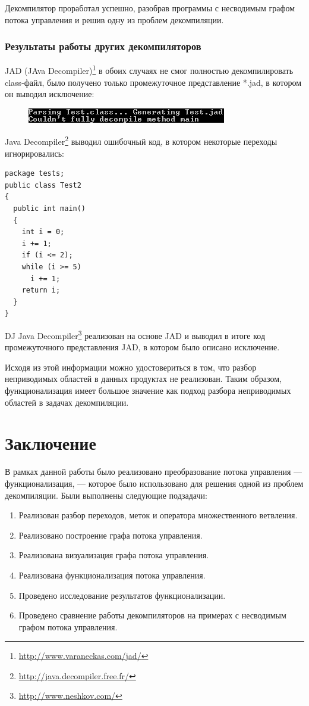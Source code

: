   
Декомпилятор проработал успешно, разобрав программы с несводимым графом потока управления и решив одну из проблем декомпиляции.  

\subsubsection*{Результаты работы других декомпиляторов}

JAD (JAva Decompiler)\footnote{\url{http://www.varaneckas.com/jad/}} в обоих случаях не смог полностью декомпилировать class-файл, было получено только промежуточное представление *.jad, в котором он выводил исключение: 
\begin{figure}[H]
\begin{center}
\includegraphics[scale=1]{Zabransky/out.png}
\end{center} 
\end{figure}
Java Decompiler\footnote{\url{http://java.decompiler.free.fr/}} выводил ошибочный код, в котором некоторые переходы игнорировались:

\begin{lstlisting}[frame=single]
package tests;
public class Test2
{
  public int main()
  {
    int i = 0;
    i += 1;
    if (i <= 2);
    while (i >= 5)
      i += 1;
    return i;
  }
}
\end{lstlisting}

DJ Java Decompiler\footnote{\url{http://www.neshkov.com/}} реализован на основе JAD и выводил в итоге код промежуточного представления JAD, в котором было описано исключение.  

Исходя из этой информации можно удостовериться в том, что разбор неприводимых областей в данных продуктах не реализован. Таким образом, функционализация имеет большое значение как подход разбора неприводимых областей в задачах декомпиляции.

\section*{Заключение}

В рамках данной работы было реализовано преобразование потока управления --- функционализация, --- которое было использовано для решения одной из проблем декомпиляции. Были выполнены следующие подзадачи:
\begin{enumerate}
  		\item Реализован разбор переходов, меток и оператора множественного ветвления.
  		\item Реализовано построение графа потока управления.
  		\item Реализована визуализация графа потока управления.
  		\item Реализована функционализация потока управления.
		\item Проведено исследование результатов функционализации.
		\item Проведено сравнение работы декомпиляторов на примерах с несводимым графом потока управления.
\end{enumerate}

